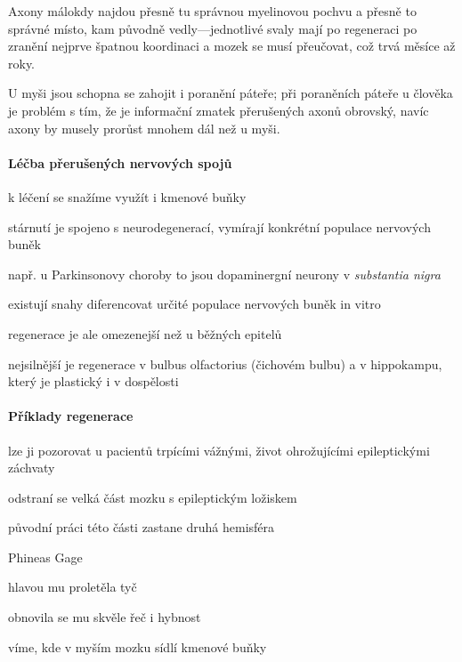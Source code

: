 \documentclass[DIV=8]{scrreprt}
\begin{document}
Axony málokdy najdou přesně tu správnou myelinovou pochvu a přesně to správné místo, kam původně vedly---jednotlivé svaly mají po regeneraci po zranění nejprve špatnou koordinaci a mozek se musí přeučovat, což trvá měsíce až roky.

U myši jsou schopna se zahojit i poranění páteře; při poraněních páteře u člověka je problém s tím, že je informační zmatek přerušených axonů obrovský, navíc axony by musely prorůst mnohem dál než u myši.

\paragraph{Léčba přerušených nervových spojů}
\begin{myItemize}[nosep]
    \item k léčení se snažíme využít i kmenové buňky
    \item stárnutí je spojeno s neurodegenerací, vymírají konkrétní populace nervových buněk
\begin{myItemize}[nosep]
    \item např. u Parkinsonovy choroby to jsou dopaminergní neurony v \emph{substantia nigra}
\end{myItemize}

    \item existují snahy diferencovat určité populace nervových buněk in vitro
    \item regenerace je ale omezenejší než u běžných epitelů
\begin{myItemize}[nosep]
    \item nejsilnější je regenerace v bulbus olfactorius (čichovém bulbu) a v hippokampu, který je plastický i v dospělosti
\end{myItemize}

\end{myItemize}



\paragraph{Příklady regenerace}
\begin{myItemize}[nosep]
    \item lze ji pozorovat u pacientů trpícími vážnými, život ohrožujícími epileptickými záchvaty
\begin{myItemize}[nosep]
    \item odstraní se velká část mozku s epileptickým ložiskem
    \item původní práci této části zastane druhá hemisféra
\end{myItemize}

    \item Phineas Gage
\begin{myItemize}[nosep]
    \item hlavou mu proletěla tyč
    \item obnovila se mu skvěle řeč i hybnost
\end{myItemize}

    \item víme, kde v myším mozku sídlí kmenové buňky
\end{myItemize}
\end{document}
